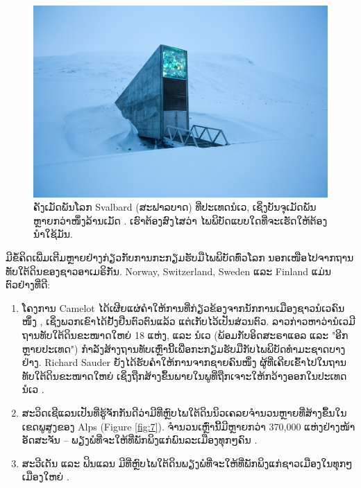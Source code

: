 \documentclass[10pt,twocolumn,letterpaper]{article}
\begin{document}
\begin{figure}[t]
\begin{center}
   \includegraphics[width=1\linewidth]{svalbard.jpg}
\end{center}
   \caption{ຄັງເມັດພັນໂລກ Svalbard (ສະຟາລບາດ) ທີ່ປະເທດນໍເວ, ເຊິ່ງບັນຈຸເມັດພັນຫຼາຍກວ່າໜຶ່ງລ້ານເມັດ \cite{24}.
ເຮົາຕ້ອງສົງໄສວ່າ ໄພພິບັດແບບໃດທີ່ຈະເຮັດໃຫ້ຕ້ອງນຳໃຊ້ມັນ. \cite{129}}
\label{fig:8}
\label{fig:onecol}
\end{figure}

ມີຂໍ້ຄິດເພີ່ມເຕີມຫຼາຍຢ່າງກ່ຽວກັບການກະກຽມຮັບມືໄພພິບັດທົ່ວໂລກ ນອກເໜືອໄປຈາກຖານທັບໃຕ້ດິນຂອງຊາວອາເມຣິກັນ. \cite{130}
Norway, Switzerland, Sweden ແລະ Finland ແມ່ນຕົວຢ່າງທີ່ດີ:

\begin{flushleft}
\begin{enumerate}
    \item ໂຄງການ Camelot ໄດ້ເຜີຍແຜ່ຄຳໃຫ້ການທີ່ກ່ຽວຂ້ອງຈາກນັກການເມືອງຊາວນໍເວຄົນໜຶ່ງ \cite{25,26}, ເຊິ່ງພວກເຂົາໄດ້ຢັ້ງຢືນຕົວຕົນແລ້ວ ແຕ່ເກັບໄວ້ເປັນສ່ວນຕົວ. \cite{131}
ລາວກ່າວຫາວ່ານໍເວມີຖານທັບໃຕ້ດິນຂະໜາດໃຫຍ່ 18 ແຫ່ງ, ແລະ ນໍເວ (ພ້ອມກັບອິດສະຣາແອລ ແລະ "ອີກຫຼາຍປະເທດ") ກໍາລັງສ້າງຖານທັບເຫຼົ່ານີ້ເພື່ອກະກຽມຮັບມືກັບໄພພິບັດທໍາມະຊາດບາງຢ່າງ. \cite{132}
Richard Sauder ຍັງໄດ້ຮັບຄຳໃຫ້ການຈາກຊາຍຄົນໜຶ່ງ ຜູ້ທີ່ເຄີຍເຂົ້າໄປໃນຖານທັບໃຕ້ດິນຂະໜາດໃຫຍ່ ເຊິ່ງຖືກສ້າງຂຶ້ນພາຍໃນພູທີ່ຖືກເຈາະໃຫ້ກວ້າງອອກໃນປະເທດນໍເວ \cite{22}. \cite{133}
    \item ສະວິດເຊີແລນເປັນທີ່ຮູ້ຈັກກັນດີວ່າມີທີ່ຫຼົບໄພໃຕ້ດິນນິວເຄລຍຈໍານວນຫຼາຍທີ່ສ້າງຂຶ້ນໃນເຂດພູສູງຂອງ Alps (Figure \ref{fig:7}). \cite{134}
ຈຳນວນເຫຼົ່ານີ້ມີຫຼາຍກວ່າ 370,000 ແຫ່ງຢ່າງໜ້າອັດສະຈັນ – ພຽງພໍທີ່ຈະໃຫ້ທີ່ພັກພິງແກ່ພົນລະເມືອງທຸກໆຄົນ \cite{27}. \cite{135}
    \item ສະວີເດັນ ແລະ ຟິນແລນ ມີທີ່ຫຼົບໄພໃຕ້ດິນພຽງພໍທີ່ຈະໃຫ້ທີ່ພັກພິງແກ່ຊາວເມືອງໃນທຸກໆເມືອງໃຫຍ່ \cite{27}. \cite{136}
\end{enumerate}
\end{flushleft}
\end{document}
